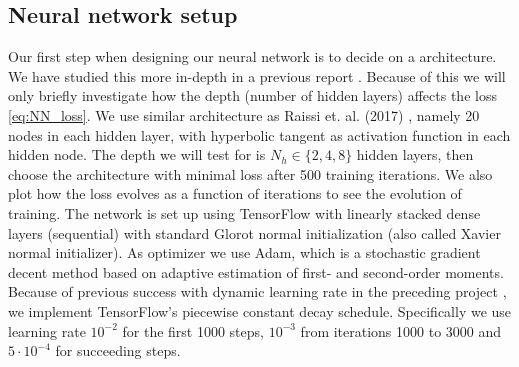 \documentclass[12pt]{extarticle}
\begin{document}
\subsection{Neural network setup}

Our first step when designing our neural network is to decide on a architecture. We have studied this more in-depth in a previous report \cite{project2}. Because of this we will only briefly investigate how the depth (number of hidden layers) affects the loss \eqref{eq:NN_loss}. We use similar architecture as Raissi et. al. (2017) \cite{raissi2017physics}, namely 20 nodes in each hidden layer, with hyperbolic tangent as activation function in each hidden node. The depth we will test for is $N_h\in\{2,4,8\}$ hidden layers, then choose the architecture with minimal loss after 500 training iterations. We also plot how the loss evolves as a function of iterations to see the evolution of training. The network is set up using TensorFlow with linearly stacked dense layers (sequential) with standard Glorot normal initialization (also called Xavier normal initializer). As optimizer we use Adam, which is a stochastic gradient decent method based on adaptive estimation of first- and second-order moments. Because of previous success with dynamic learning rate in the preceding project \cite{project2}, we implement TensorFlow's piecewise constant decay schedule. Specifically we use learning rate $10^{-2}$ for the first 1000 steps, $10^{-3}$ from iterations 1000 to 3000 and $5 \cdot 10^{-4}$ for succeeding steps.
\end{document}
